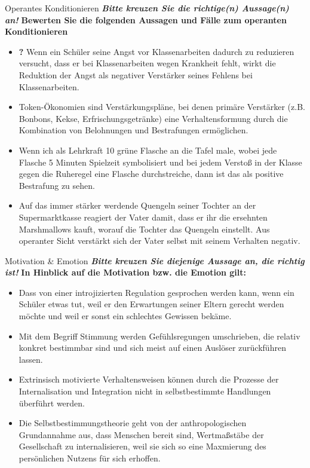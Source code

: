 \documentclass[a4paper]{article}
\newcommand{\ACorrectAnswer}{\rlap{$\square$}{\raisebox{2pt}{\large\hspace{1pt}\ding{51}}}\hspace{-2.5pt}}
\newcommand{\AWrongAnswer}{\rlap{$\square$}{\large\hspace{1pt}\ding{55}}}
\newcommand{\AnUnsureAnswer}{\rlap{$\square$}{\large\hspace{1pt}\textbf?}}
\newcommand{\defaultCorrect}{\ding{51}}
\newcommand{\defaultWrong}{\ding{55}}
\newcommand{\defaultUnsure}{\textbf{?}}
\newenvironment{answers}{\begin{itemize}}{\end{itemize}}
\newcommand{\correct}{\defaultCorrect}
\newcommand{\wrong}{\defaultWrong}
\newcommand{\unsure}{\defaultUnsure}
\newenvironment{question}[2]{%
    \section[#1 \normalfont(#2)]{#1\\\small\normalfont\hyperlink{tableofcontents}{zurück zum Inhaltsverzeichnis}}%
}{%
    \newpage%
}
\newcommand{\questiontext}[1]{\textbf{#1}}
\newcommand{\assignment}[1]{\textbf{\textit{#1}}\newline}
\newenvironment{multiple-choice}[1]{%
    \begin{question}{#1}{Multiple Choice}%
    \renewenvironment{answers}{%
        \begin{multiple-choice-list}}{\end{multiple-choice-list}%
    }%
    \renewcommand{\correct}{\ACorrectAnswer}%
    \renewcommand{\wrong}{\AWrongAnswer}%
    \renewcommand{\unsure}{\AnUnsureAnswer}%
}%
{%
    \renewcommand{\correct}{\defaultCorrect}%
    \renewcommand{\wrong}{\defaultWrong}%
    \renewcommand{\unsure}{\defaultUnsure}%
    \end{question}%
}
\begin{document}
\begin{multiple-choice}{Operantes Konditionieren}
    \assignment{Bitte kreuzen Sie die richtige(n) Aussage(n) an!}
    \questiontext{Bewerten Sie die folgenden Aussagen und Fälle zum operanten Konditionieren}
    \begin{answers}
        \item[\unsure] Wenn ein Schüler seine Angst vor Klassenarbeiten dadurch zu reduzieren versucht, dass er bei Klassenarbeiten wegen Krankheit fehlt, wirkt die Reduktion der Angst als negativer Verstärker seines Fehlens bei Klassenarbeiten.
        \item[\correct] Token-Ökonomien sind Verstärkungspläne, bei denen primäre Verstärker (z.B. Bonbons, Kekse, Erfrischungsgetränke) eine Verhaltensformung durch die Kombination von Belohnungen und Bestrafungen ermöglichen.
        \item[\correct] Wenn ich als Lehrkraft 10 grüne Flasche an die Tafel male, wobei jede Flasche 5 Minuten Spielzeit symbolisiert und bei jedem Verstoß in der Klasse gegen die Ruheregel eine Flasche durchstreiche, dann ist das als positive Bestrafung zu sehen.
        \item[\wrong] Auf das immer stärker werdende Quengeln seiner Tochter an der Supermarktkasse reagiert der Vater damit, dass er ihr die ersehnten Marshmallows kauft, worauf die Tochter das Quengeln einstellt. Aus operanter Sicht verstärkt sich der Vater selbst mit seinem Verhalten negativ.
    \end{answers}
\end{multiple-choice}

\begin{multiple-choice}{Motivation \& Emotion}
    \assignment{Bitte kreuzen Sie diejenige Aussage an, die richtig ist!}
    \questiontext{In Hinblick auf die Motivation bzw. die Emotion gilt:}
    \begin{answers}
        \item[\correct] Dass von einer introjizierten Regulation gesprochen werden kann, wenn ein Schüler etwas tut, weil er den Erwartungen seiner Eltern gerecht werden möchte und weil er sonst ein schlechtes Gewissen bekäme.
        \item[\wrong] Mit dem Begriff Stimmung werden Gefühlsregungen umschrieben, die relativ konkret bestimmbar sind und sich meist auf einen Auslöser zurückführen lassen.
        \item[\wrong] Extrinsisch motivierte Verhaltensweisen können durch die Prozesse der Internalisation und Integration nicht in selbstbestimmte Handlungen überführt werden.
        \item[\wrong] Die Selbstbestimmungstheorie geht von der anthropologischen Grundannahme aus, dass Menschen bereit sind, Wertmaßstäbe der Gesellschaft zu internalisieren, weil sie sich so eine Maxmierung des persönlichen Nutzens für sich erhoffen. 
    \end{answers}
\end{multiple-choice}
\end{document}

